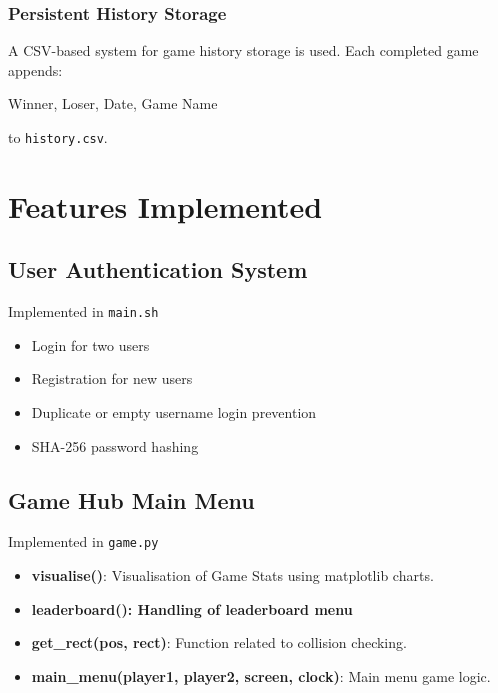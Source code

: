 \documentclass[12pt,a4paper]{article}
\begin{document}
\subsubsection{Persistent History Storage}
A CSV-based system for game history storage is used.
Each completed game appends:

\begin{center}
Winner, Loser, Date, Game Name
\end{center}

to \texttt{history.csv}.



\section{Features Implemented}

\subsection{User Authentication System}

Implemented in \texttt{main.sh}

\begin{itemize}
    \item Login for two users
    \item Registration for new users
    \item Duplicate or empty username login prevention
    \item SHA-256 password hashing
\end{itemize}

\subsection{Game Hub Main Menu}

Implemented in \texttt{game.py}

\begin{itemize}
    \item \textbf{visualise()}: Visualisation of Game Stats using matplotlib charts.
    \item \textbf{leaderboard(): Handling of leaderboard menu}
    \item \textbf{get\_rect(pos, rect)}: Function related to collision checking.
    \item \textbf{main\_menu(player1, player2, screen, clock)}: Main menu game logic.
    
\end{itemize}
\end{document}
